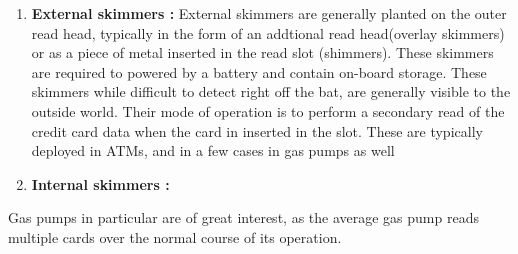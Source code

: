 \begin{enumerate}
	\item \textbf{External skimmers :} External skimmers are generally planted on the outer read head, typically in the form of an addtional read head(overlay skimmers) or as a piece of metal inserted in the read slot (shimmers). These skimmers are required to powered by a battery and contain on-board storage. These skimmers while difficult to detect right off the bat, are generally visible to the outside world. Their mode of operation is to perform a secondary read of the credit card data when the card in inserted in the slot. These are typically deployed in ATMs, and in a few cases in gas pumps as well 
	\item \textbf{Internal skimmers :} 
\end{enumerate}

Gas pumps in particular are of great interest, as the average gas pump reads
multiple cards over the normal course of its operation. 

\fi

